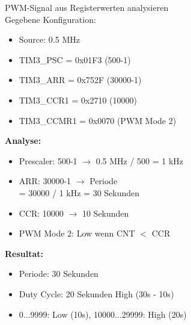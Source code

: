 \begin{example2}{PWM-Signal aus Registerwerten analysieren}\\
    Gegebene Konfiguration:
    \begin{itemize}
        \item Source: 0.5 MHz
        \item TIM3\_PSC = 0x01F3 (500-1)
        \item TIM3\_ARR = 0x752F (30000-1)
        \item TIM3\_CCR1 = 0x2710 (10000)
        \item TIM3\_CCMR1 = 0x0070 (PWM Mode 2)
    \end{itemize}
    
    \tcblower
    
    \textbf{Analyse:}
    \begin{itemize}
        \item Prescaler: 500-1 $\rightarrow$ 0.5 MHz / 500 = 1 kHz
        \item ARR: 30000-1 $\rightarrow$ Periode \\ = 30000 / 1 kHz = 30 Sekunden
        \item CCR: 10000 $\rightarrow$ 10 Sekunden
        \item PWM Mode 2: Low wenn CNT $<$ CCR
    \end{itemize}
    
    \textbf{Resultat:}
    \begin{itemize}
        \item Periode: 30 Sekunden
        \item Duty Cycle: 20 Sekunden High (30s - 10s)
        \item 0...9999: Low (10s), 10000...29999: High (20s)
    \end{itemize}
\end{example2}


